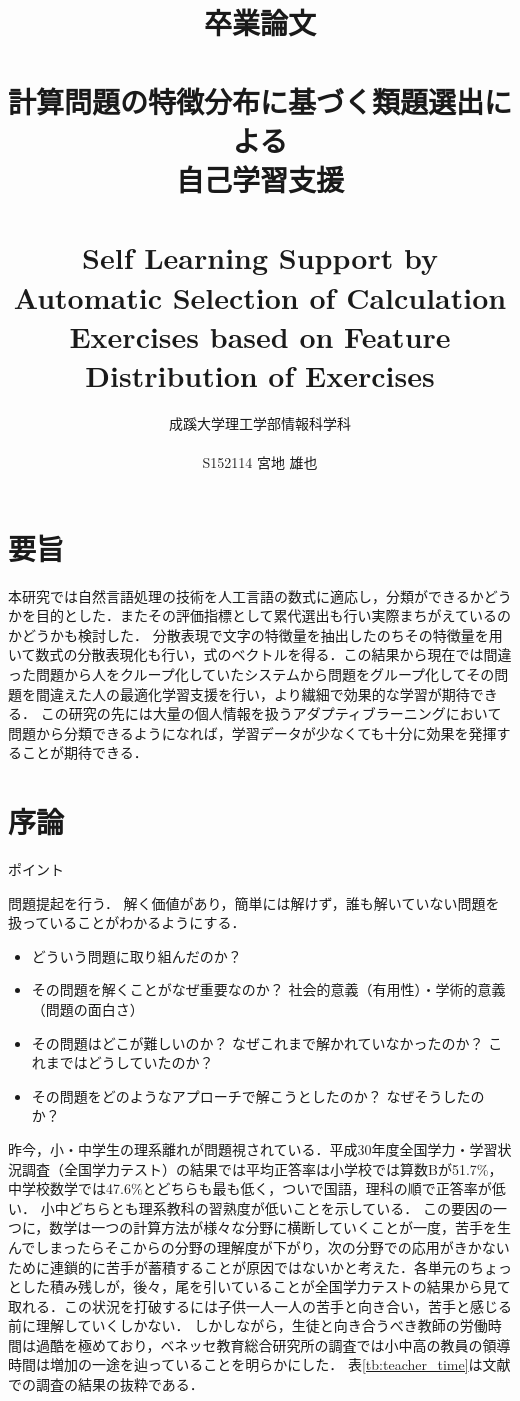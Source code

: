 \documentclass[a4j,11pt,report]{jsbook}
\title{卒業論文\\ \vspace{3em}\\{\huge #1}\\ \\#2\vspace{15em}}%
\author{{\huge 成蹊大学理工学部情報科学科}\\ \\{\huge #3}}%
\date{}
\newcommand{\frontpage}[3]{%
\title{卒業論文\\ \vspace{3em}\\{\huge #1}\\ \\#2\vspace{15em}}%
\author{{\huge 成蹊大学理工学部情報科学科}\\ \\{\huge #3}}%
\date{}
\maketitle
\clearpage
\thispagestyle{empty}

\clearpage
}
\newcommand{\point}[1]{
\begin{itembox}[l]{ポイント}
  #1
\end{itembox}
}
\begin{document}
\frontpage  %
{計算問題の特徴分布に基づく類題選出による\\自己学習支援}
{Self Learning Support by Automatic Selection of Calculation Exercises based on Feature Distribution of Exercises}
{S152114 宮地 雄也 }



\chapter*{要旨}
\thispagestyle{empty}

本研究では自然言語処理の技術を人工言語の数式に適応し，分類ができるかどうかを目的とした．またその評価指標として累代選出も行い実際まちがえているのかどうかも検討した．
分散表現で文字の特徴量を抽出したのちその特徴量を用いて数式の分散表現化も行い，式のベクトルを得る．この結果から現在では間違った問題から人をクループ化していたシステムから問題をグループ化してその問題を間違えた人の最適化学習支援を行い，より繊細で効果的な学習が期待できる．
この研究の先には大量の個人情報を扱うアダプティブラーニングにおいて問題から分類できるようになれば，学習データが少なくても十分に効果を発揮することが期待できる．


\tableofcontents
\thispagestyle{empty}
\clearpage
\thispagestyle{plain}
\setcounter{page}{1}

\chapter{序論 \label{ch:introduction}}

\point{
問題提起を行う．
解く価値があり，簡単には解けず，誰も解いていない問題を扱っていることがわかるようにする．
\begin{itemize}
  \item どういう問題に取り組んだのか？
  \item その問題を解くことがなぜ重要なのか？ 社会的意義（有用性）・学術的意義（問題の面白さ）
  \item その問題はどこが難しいのか？ なぜこれまで解かれていなかったのか？ これまではどうしていたのか？
  \item その問題をどのようなアプローチで解こうとしたのか？ なぜそうしたのか？
\end{itemize}
}
\fi

昨今，小・中学生の理系離れが問題視されている．平成30年度全国学力・学習状況調査（全国学力テスト）の結果では平均正答率は小学校では算数Bが51.7\%，中学校数学では47.6\%とどちらも最も低く，ついで国語，理科の順で正答率が低い．
小中どちらとも理系教科の習熟度が低いことを示している．
この要因の一つに，数学は一つの計算方法が様々な分野に横断していくことが一度，苦手を生んでしまったらそこからの分野の理解度が下がり，次の分野での応用がきかないために連鎖的に苦手が蓄積することが原因ではないかと考えた．各単元のちょっとした積み残しが，後々，尾を引いていることが全国学力テストの結果から見て取れる．この状況を打破するには子供一人一人の苦手と向き合い，苦手と感じる前に理解していくしかない．
しかしながら，生徒と向き合うべき教師の労働時間は過酷を極めており，ベネッセ教育総合研究所の調査では小中高の教員の領導時間は増加の一途を辿っていることを明らかにした．
表\ref{tb:teacher_time}は文献\cite{benesse_DateBook}での調査の結果の抜粋である．
\end{document}
